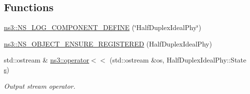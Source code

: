 \subsection*{Functions}
\begin{DoxyCompactItemize}
\item 
\hyperlink{namespacens3_a098353dc18e03f11d42a47a896b65fb7}{ns3\+::\+N\+S\+\_\+\+L\+O\+G\+\_\+\+C\+O\+M\+P\+O\+N\+E\+N\+T\+\_\+\+D\+E\+F\+I\+NE} (\char`\"{}Half\+Duplex\+Ideal\+Phy\char`\"{})
\item 
\hyperlink{namespacens3_a92e3bae00d215cb61cc2b5710bc8fe21}{ns3\+::\+N\+S\+\_\+\+O\+B\+J\+E\+C\+T\+\_\+\+E\+N\+S\+U\+R\+E\+\_\+\+R\+E\+G\+I\+S\+T\+E\+R\+ED} (Half\+Duplex\+Ideal\+Phy)
\item 
std\+::ostream \& \hyperlink{namespacens3_a38a1504744d7afa2f95c6a89690e02e5}{ns3\+::operator$<$$<$} (std\+::ostream \&os, Half\+Duplex\+Ideal\+Phy\+::\+State \hyperlink{generate__test__data__lte__sinr_8m_ad83eeb3a142285d1243a08c6b7026df8}{s})
\begin{DoxyCompactList}\small\item\em Output stream operator. \end{DoxyCompactList}\end{DoxyCompactItemize}

